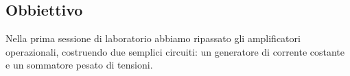 \subsection{Obbiettivo}

Nella prima sessione di laboratorio abbiamo ripassato gli amplificatori
operazionali, costruendo due semplici circuiti: un generatore di corrente costante
e un sommatore pesato di tensioni.

